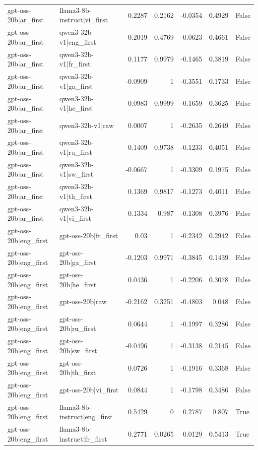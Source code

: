 \begin{table}
\begin{tabular}{l l r r r r l}
gpt-oss-20b|ar_first & llama3-8b-instruct|vi_first & 0.2287 & 0.2162 & -0.0354 & 0.4929 & False \\
gpt-oss-20b|ar_first & qwen3-32b-v1|eng_first & 0.2019 & 0.4769 & -0.0623 & 0.4661 & False \\
gpt-oss-20b|ar_first & qwen3-32b-v1|fr_first & 0.1177 & 0.9979 & -0.1465 & 0.3819 & False \\
gpt-oss-20b|ar_first & qwen3-32b-v1|ga_first & -0.0909 & 1 & -0.3551 & 0.1733 & False \\
gpt-oss-20b|ar_first & qwen3-32b-v1|he_first & 0.0983 & 0.9999 & -0.1659 & 0.3625 & False \\
gpt-oss-20b|ar_first & qwen3-32b-v1|raw & 0.0007 & 1 & -0.2635 & 0.2649 & False \\
gpt-oss-20b|ar_first & qwen3-32b-v1|ru_first & 0.1409 & 0.9738 & -0.1233 & 0.4051 & False \\
gpt-oss-20b|ar_first & qwen3-32b-v1|sw_first & -0.0667 & 1 & -0.3309 & 0.1975 & False \\
gpt-oss-20b|ar_first & qwen3-32b-v1|th_first & 0.1369 & 0.9817 & -0.1273 & 0.4011 & False \\
gpt-oss-20b|ar_first & qwen3-32b-v1|vi_first & 0.1334 & 0.987 & -0.1308 & 0.3976 & False \\
gpt-oss-20b|eng_first & gpt-oss-20b|fr_first & 0.03 & 1 & -0.2342 & 0.2942 & False \\
gpt-oss-20b|eng_first & gpt-oss-20b|ga_first & -0.1203 & 0.9971 & -0.3845 & 0.1439 & False \\
gpt-oss-20b|eng_first & gpt-oss-20b|he_first & 0.0436 & 1 & -0.2206 & 0.3078 & False \\
gpt-oss-20b|eng_first & gpt-oss-20b|raw & -0.2162 & 0.3251 & -0.4803 & 0.048 & False \\
gpt-oss-20b|eng_first & gpt-oss-20b|ru_first & 0.0644 & 1 & -0.1997 & 0.3286 & False \\
gpt-oss-20b|eng_first & gpt-oss-20b|sw_first & -0.0496 & 1 & -0.3138 & 0.2145 & False \\
gpt-oss-20b|eng_first & gpt-oss-20b|th_first & 0.0726 & 1 & -0.1916 & 0.3368 & False \\
gpt-oss-20b|eng_first & gpt-oss-20b|vi_first & 0.0844 & 1 & -0.1798 & 0.3486 & False \\
gpt-oss-20b|eng_first & llama3-8b-instruct|eng_first & 0.5429 & 0 & 0.2787 & 0.807 & True \\
gpt-oss-20b|eng_first & llama3-8b-instruct|fr_first & 0.2771 & 0.0265 & 0.0129 & 0.5413 & True \\

\end{tabular}
\end{table}
